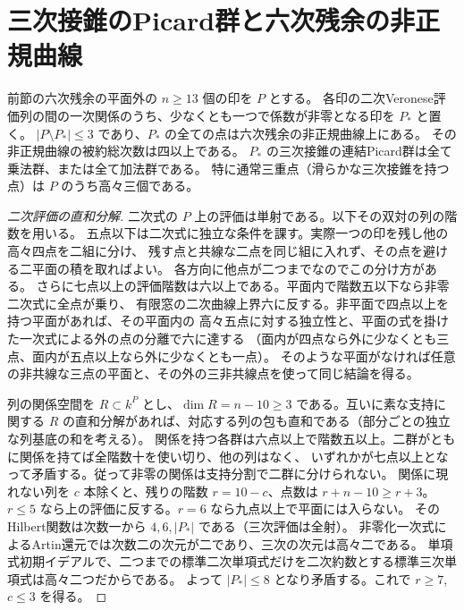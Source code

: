 \section{三次接錐のPicard群と六次残余の非正規曲線}
\label{sec:residual-sextic-cubic-tangents}
\begin{theorem}\label{thm:residual-sextic-cubic-tangents}
前節の六次残余の平面外の $n\ge13$ 個の印を $P$ とする。
各印の二次Veronese評価列の間の一次関係のうち、少なくとも一つで係数が非零となる印を $P_*$ と置く。
$|P\setminus P_*|\le3$ であり、$P_*$ の全ての点は六次残余の非正規曲線上にある。
その非正規曲線の被約総次数は四以上である。
$P_*$ の三次接錐の連結Picard群は全て乗法群、または全て加法群である。
特に通常三重点（滑らかな三次接錐を持つ点）は $P$ のうち高々三個である。
\end{theorem}
\begin{proof}[二次評価の直和分解]
二次式の $P$ 上の評価は単射である。以下その双対の列の階数を用いる。
五点以下は二次式に独立な条件を課す。実際一つの印を残し他の高々四点を二組に分け、
残す点と共線な二点を同じ組に入れず、その点を避ける二平面の積を取ればよい。
各方向に他点が二つまでなのでこの分け方がある。
さらに七点以上の評価階数は六以上である。平面内で階数五以下なら非零二次式に全点が乗り、
有限窓の二次曲線上界六に反する。非平面で四点以上を持つ平面があれば、その平面内の
高々五点に対する独立性と、平面の式を掛けた一次式による外の点の分離で六に達する
（面内が四点なら外に少なくとも三点、面内が五点以上なら外に少なくとも一点）。
そのような平面がなければ任意の非共線な三点の平面と、その外の三非共線点を使って同じ結論を得る。

列の関係空間を $R\subset k^P$ とし、$\dim R=n-10\ge3$ である。互いに素な支持に関する
$R$ の直和分解があれば、対応する列の包も直和である（部分ごとの独立な列基底の和を考える）。
関係を持つ各群は六点以上で階数五以上。二群がともに関係を持てば全階数十を使い切り、他の列はなく、
いずれかが七点以上となって矛盾する。従って非零の関係は支持分割で二群に分けられない。
関係に現れない列を $c$ 本除くと、残りの階数 $r=10-c$、点数は $r+n-10\ge r+3$。
$r\le5$ なら上の評価に反する。$r=6$ なら九点以上で平面には入らない。
そのHilbert関数は次数一から $4,6,|P_*|$ である（三次評価は全射）。
非零化一次式によるArtin還元では次数二の次元が二であり、三次の次元は高々二である。
単項式初期イデアルで、二つまでの標準二次単項式だけを二次約数とする標準三次単項式は高々二つだからである。
よって $|P_*|\le8$ となり矛盾する。これで $r\ge7$, $c\le3$ を得る。
\end{proof}
